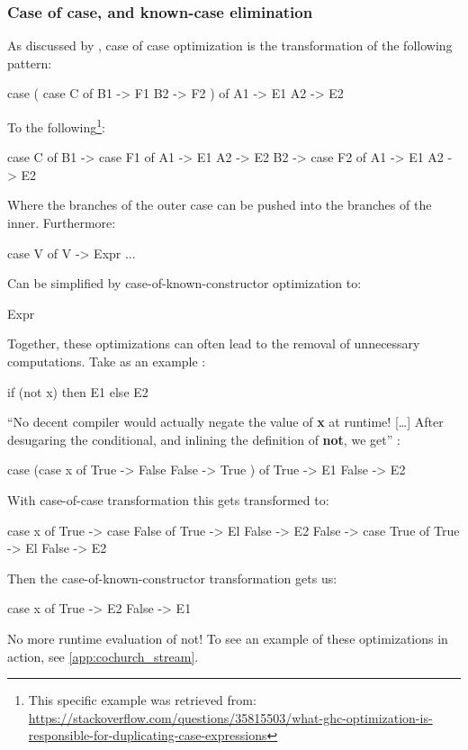 \subsubsection{Case of case, and known-case elimination}
As discussed by \cite{Jones1996}, case of case optimization is the transformation of the following pattern:
\begin{spec}
case ( 
  case C of 
    B1 -> F1
    B2 -> F2
  ) of
  A1 -> E1
  A2 -> E2
\end{spec}
To the following\footnote{This specific example was retrieved from: \url{https://stackoverflow.com/questions/35815503/what-ghc-optimization-is-responsible-for-duplicating-case-expressions}}:
\begin{spec}
case C of    
  B1 -> case F1 of
    A1 -> E1
    A2 -> E2
  B2 -> case F2 of
    A1 -> E1
    A2 -> E2
\end{spec}
Where the branches of the outer case can be pushed into the branches of the inner.
Furthermore:
\begin{spec}
case V of
  V -> Expr
  ...
\end{spec}
Can be simplified by case-of-known-constructor optimization to:
\begin{spec}
Expr
\end{spec}
Together, these optimizations can often lead to the removal of unnecessary computations. Take as an example \citep{Jones1996}:
\begin{spec}
if (not x) then E1 else E2
\end{spec}
``No decent compiler would actually negate the value of \textbf{x} at runtime! [\ldots] After desugaring the conditional, and inlining the definition of \textbf{not}, we get'' \citep{Jones1996}:
\begin{spec}
case (case x of
  True -> False
  False -> True
) of 
  True -> E1 
  False -> E2
\end{spec}
With case-of-case transformation this gets transformed to:
\begin{spec}
case x of 
  True -> case False of
    True -> El
    False -> E2
  False -> case True of
    True -> El
    False -> E2
\end{spec}
Then the case-of-known-constructor transformation gets us:
\begin{spec}
case x of
  True -> E2
  False -> E1
\end{spec}
No more runtime evaluation of not!
To see an example of these optimizations in action, see \autoref{app:cochurch_stream}.



